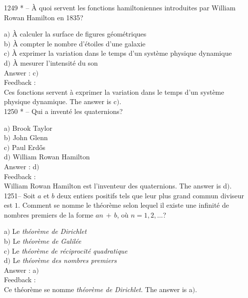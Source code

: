 \documentclass[letterpaper, 12pt]{article}
\begin{document}
1249 * -- \`A quoi servent les fonctions hamiltoniennes introduites
par William Rowan Hamilton en 1835?

a$)$ \`A calculer la surface de figures g\'eom\'etriques \\
b$)$ \`A compter le nombre d'\'etoiles d'une galaxie \\
c$)$ \`A exprimer la variation dans le temps d'un syst\`eme physique
dynamique \\
d$)$ \`A mesurer l'intensit\'e du son \\

Answer : c$)$\\

Feedback : \\
Ces fonctions servent \`a exprimer la variation dans le temps d'un
syst\`eme physique dynamique.
The answer is c$)$.\\

1250 * -- Qui a invent\'e les quaternions?

a$)$ Brook Taylor \\
b$)$ John Glenn \\
c$)$ Paul Erd\H{o}s \\
d$)$ William Rowan Hamilton\\

Answer : d$)$\\

Feedback : \\
William Rowan Hamilton est l'inventeur des quaternions.
The answer is d$)$.\\

1251-- Soit $a$ et $b$ deux entiers positifs tels que leur plus
grand commun diviseur est $1$. Comment se nomme le th\'eor\`eme
selon lequel il existe une infinit\'e de nombres premiers de la
forme $an\,+\,b$, o\`u $n=1,2,\ldots$?

a$)$ Le {\sl th\'eor\`eme de Dirichlet} \\
b$)$ Le {\sl th\'eor\`eme de Galil\'ee} \\
c$)$ Le {\sl th\'eor\`eme de r\'eciprocit\'e quadratique} \\
d$)$ Le {\sl th\'eor\`eme des nombres premiers}\\

Answer : a$)$\\

Feedback : \\
Ce th\'eor\`eme se nomme {\sl th\'eor\`eme de Dirichlet}.
The answer is a$)$.\\
\end{document}
